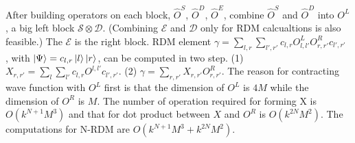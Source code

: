   After building operators on each block, $\hat{O}^S$, $\hat{O}^D$, $\hat{O}^E$, combine $\hat{O}^S$ and $\hat{O}^D$ into $O^L$, a big left block $\mathcal{S}\otimes \mathcal{D}$. (Combining $\mathcal{E}$ and $\mathcal{D}$ only for RDM calcualtions is also feasible.) The $\mathcal{E}$ is the right block.
  RDM element $\gamma = \sum_{l,r}\sum_{l',r'} c_{l,r} O^{L}_{l,l'} O^R_{r,r'}c_{l',r'}$ , with $\ket{\Psi} = c_{l,r}\ket{l}\ket{r}$, can be computed in two step. (1) $X_{r,r'} = \sum_{l}\sum_{l'} c_{l,r} O^{l,l'} c_{l',r'}$. (2) $\gamma = \sum_{r,r'} X_{r,r'} O^R_{r,r'}$.
  The reason for contracting wave function with $O^L$ first is that the dimension of $O^L$ is $4M$ while the dimension of $O^R$ is $M$.
  The number of operation required for forming X is $O(k^{N+1}M^3)$ and that for dot product between $X$ and $O^R$ is $O(k^{2N}M^2)$. 
  The computations for N-RDM are $O(k^{N+1}M^3+k^{2N}M^2)$.





